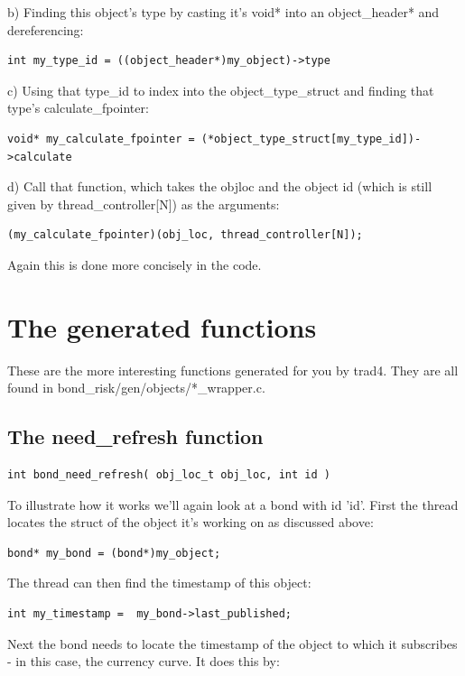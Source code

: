 \documentclass{report}
\begin{document}
b) Finding this object's type by casting it's void* into an object_header* and dereferencing:
\begin{verbatim}
int my_type_id = ((object_header*)my_object)->type  
\end{verbatim}

c) Using that type_id to index into the object_type_struct and finding that type's calculate_fpointer:
\begin{verbatim}
void* my_calculate_fpointer = (*object_type_struct[my_type_id])->calculate
\end{verbatim}

d) Call that function, which takes the objloc and the object id (which is still given by thread_controller[N]) as the arguments:
\begin{verbatim}
(my_calculate_fpointer)(obj_loc, thread_controller[N]);
\end{verbatim}

Again this is done more concisely in the code.

\section{The generated functions}

These are the more interesting functions generated for you by trad4. They are all found in bond_risk/gen/objects/*_wrapper.c.

\subsection{The need_refresh function}

\begin{verbatim}
int bond_need_refresh( obj_loc_t obj_loc, int id )
\end{verbatim}

To illustrate how it works we'll again look at a bond with id 'id'.  First the thread locates the struct of the object it's working on as discussed above:

\begin{verbatim}
bond* my_bond = (bond*)my_object;
\end{verbatim}

The thread can then find the timestamp of this object:
\begin{verbatim}
int my_timestamp =  my_bond->last_published;
\end{verbatim}

Next the bond needs to locate the timestamp of the object to which it subscribes - in this case, the 
currency curve. It does this by:
\end{document}
